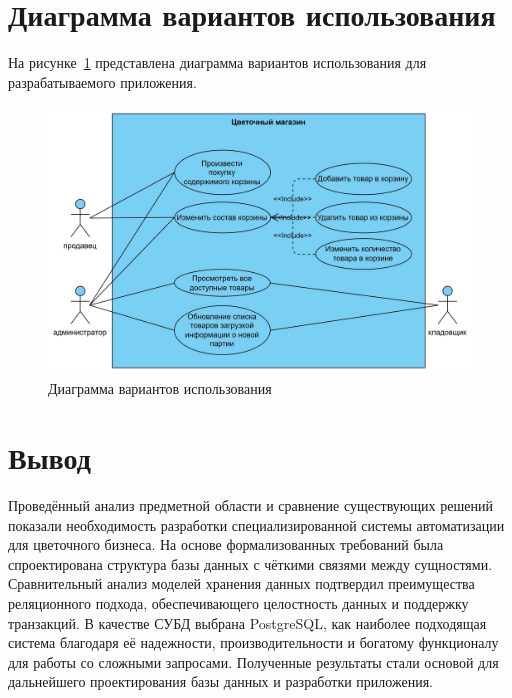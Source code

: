 \section{Диаграмма вариантов использования}
На рисунке~\ref{fig:UseCase} представлена диаграмма вариантов использования для разрабатываемого приложения.
\begin{figure}
	\centering
	\includegraphics[width=1\linewidth]{pictures/use_case_2}
	\caption{Диаграмма вариантов использования}
	\label{fig:UseCase}
\end{figure}
\section*{Вывод}
Проведённый анализ предметной области и сравнение существующих решений показали необходимость разработки специализированной системы автоматизации для цветочного бизнеса. На основе формализованных требований была спроектирована структура базы данных с чёткими связями между сущностями. Сравнительный анализ моделей хранения данных подтвердил преимущества реляционного подхода, обеспечивающего целостность данных и поддержку транзакций. В качестве СУБД выбрана PostgreSQL, как наиболее подходящая система благодаря её надежности, производительности и богатому функционалу для работы со сложными запросами. Полученные результаты стали основой для дальнейшего проектирования базы данных и разработки приложения.
